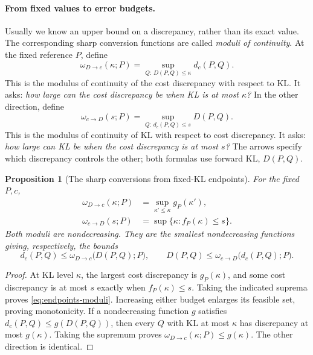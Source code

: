 \documentclass[11pt,twoside]{article}
\newcommand{\KL}{D}
\newtheorem{proposition}[theorem]{Proposition}
\theoremstyle{definition}
\theoremstyle{remark}
\begin{document}
\paragraph{From fixed values to error budgets.}
Usually we know an upper bound on a discrepancy, rather than its exact
value. The corresponding sharp conversion functions are called
\emph{moduli of continuity}. At the fixed reference \(P\), define
\begin{equation}
 \omega_{D\to c}(\kappa;P)
 =\sup_{Q:\,\KL(P, Q)\le\kappa}d_c(P,Q).
 \label{eq:cost-modulus}
\end{equation}
This is the modulus of continuity of the cost discrepancy with respect to KL. It asks:
\emph{how large can the cost discrepancy be when KL is at most \(\kappa\)?}
In the other direction, define
\begin{equation}
 \omega_{c\to D}(s;P)
 =\sup_{Q:\,d_c(P,Q)\le s}\KL(P, Q).
 \label{eq:kl-modulus}
\end{equation}
This is the modulus of continuity of KL with respect to cost discrepancy. It asks:
\emph{how large can KL be when the cost discrepancy is at most \(s\)?}
The arrows specify which discrepancy controls the other; both formulas
use forward KL, \(\KL(P, Q)\).

\begin{proposition}[The sharp conversions from fixed-KL endpoints]
\label{prop:endpoints-moduli}
For the fixed \(P,c\),
\begin{equation}
 \begin{split}
 \omega_{D\to c}(\kappa;P)&=\sup_{\kappa'\le\kappa}g_P(\kappa'),\\
 \omega_{c\to D}(s;P)&=\sup\{\kappa:f_P(\kappa)\le s\}.
 \end{split}
 \label{eq:endpoints-moduli}
\end{equation}
Both moduli are nondecreasing. They are the smallest nondecreasing
functions giving, respectively, the bounds
\[
 d_c(P,Q)\le\omega_{D\to c}\bigl(\KL(P, Q);P\bigr),
 \qquad
 \KL(P, Q)\le\omega_{c\to D}\bigl(d_c(P,Q);P\bigr).
\]
\end{proposition}

\begin{proof}
At KL level \(\kappa\), the largest cost discrepancy is \(g_P(\kappa)\),
and some cost discrepancy is at most \(s\) exactly when
\(f_P(\kappa)\le s\).
Taking the indicated suprema proves \cref{eq:endpoints-moduli}.
Increasing either budget enlarges its feasible set, proving
monotonicity. If a nondecreasing function \(g\) satisfies
\(d_c(P,Q)\le g(\KL(P, Q))\), then every \(Q\) with KL at most
\(\kappa\) has discrepancy at most \(g(\kappa)\). Taking the supremum proves
\(\omega_{D\to c}(\kappa;P)\le g(\kappa)\). The other direction is identical.
\end{proof}
\end{document}
